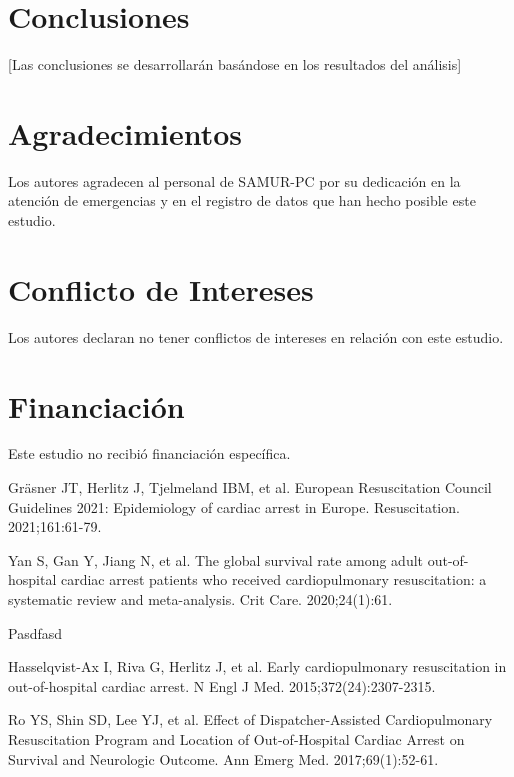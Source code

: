 \documentclass[10pt,a4paper]{article}
\begin{document}
\begin{multicols}{2}
\section{Conclusiones}

[Las conclusiones se desarrollarán basándose en los resultados del análisis]

\section{Agradecimientos}

Los autores agradecen al personal de SAMUR-PC por su dedicación en la atención de emergencias y en el registro de datos que han hecho posible este estudio.

\section{Conflicto de Intereses}

Los autores declaran no tener conflictos de intereses en relación con este estudio.

\section{Financiación}

Este estudio no recibió financiación específica.

\begin{thebibliography}{99}

 Gräsner JT, Herlitz J, Tjelmeland IBM, et al. European Resuscitation Council Guidelines 2021: Epidemiology of cardiac arrest in Europe. Resuscitation. 2021;161:61-79.

 Yan S, Gan Y, Jiang N, et al. The global survival rate among adult out-of-hospital cardiac arrest patients who received cardiopulmonary resuscitation: a systematic review and meta-analysis. Crit Care. 2020;24(1):61.

 Pasdfasd

 Hasselqvist-Ax I, Riva G, Herlitz J, et al. Early cardiopulmonary resuscitation in out-of-hospital cardiac arrest. N Engl J Med. 2015;372(24):2307-2315.

 Ro YS, Shin SD, Lee YJ, et al. Effect of Dispatcher-Assisted Cardiopulmonary Resuscitation Program and Location of Out-of-Hospital Cardiac Arrest on Survival and Neurologic Outcome. Ann Emerg Med. 2017;69(1):52-61.

\end{thebibliography}

\end{multicols}
\end{document}
